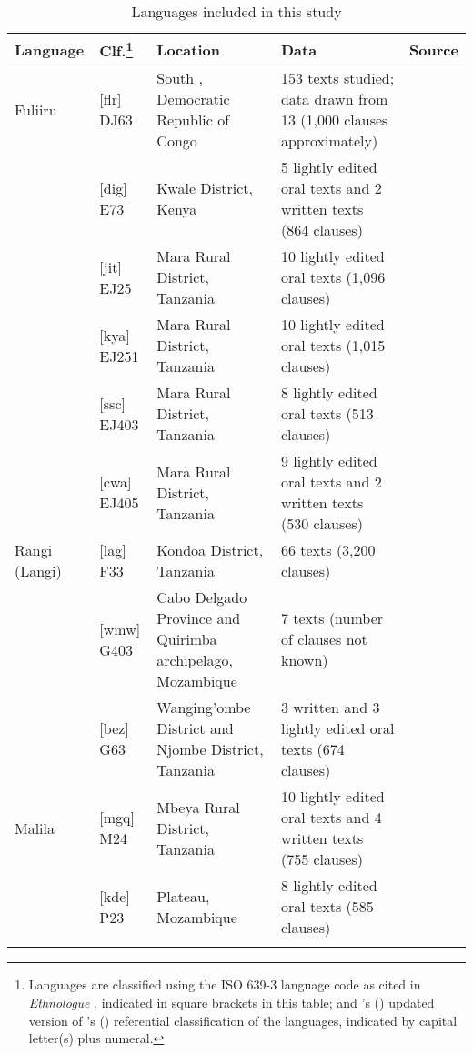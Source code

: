 \documentclass[output=paper]{langsci/langscibook}
\begin{document}
\begin{table}
 
\begin{tabularx}{\textwidth}{p{1.5cm}p{1cm}QQp{2cm}}
\lsptoprule
Language & Clf.\footnote{Languages are classified using the ISO 639-3 language code as cited in \textit{Ethnologue} \citep{lewisetal2015}, indicated in square brackets in this table; and \citeauthor{maho2003}’s (\citeyear{maho2003}) updated version of \citeauthor{guthrie1967}’s (\citeyear{guthrie1967}) referential classification of the  languages, indicated by capital letter(s) plus numeral.}
			    & Location & Data & Source\\
\midrule
Fuliiru & [flr] DJ63 & South , Democratic Republic of Congo & 153 texts studied; data drawn from 13 (1,000 clauses approximately) & \citet{vanotterloo2011,vanotterloo2015}\\
  & [dig] E73 & Kwale District, Kenya & 5 lightly edited oral texts and 2 written texts (864 clauses) & \citet{nicolle2015a}\\
  & [jit] EJ25 & Mara Rural District, Tanzania & 10 lightly edited oral texts (1,096 clauses) & \citet{pylerobinson2015}\\
  & [kya] EJ251 & Mara Rural District, Tanzania & 10 lightly edited oral texts (1,015 clauses) & \citet{odom2015}\\
  & [ssc] EJ403 & Mara Rural District, Tanzania & 8 lightly edited oral texts (513 clauses) & \citet{masatu2015}\\
  & [cwa] EJ405 & Mara Rural District, Tanzania & 9 lightly edited oral texts and 2 written texts (530 clauses) & \citet{walker2011}\\
 Rangi (Langi) & [lag] F33 & Kondoa District, Tanzania & 66 texts (3,200 clauses) & \citet{Stegen2011}\\
  & [wmw] G403 & Cabo Delgado Province and Quirimba archipelago, Mozambique & 7 texts (number of clauses not known) & \citet{floor2005}\\
  & [bez] G63 & Wanging’ombe District and Njombe District, Tanzania & 3 written and 3 lightly edited oral texts (674 clauses) & \citet{broomhall2011,eaton2015a}\\
 Malila & [mgq] M24 & Mbeya Rural District, Tanzania & 10 lightly edited oral texts and 4 written texts (755 clauses) & \citet{eaton2015b}\\
  & [kde] P23 &  Plateau, Mozambique & 8 lightly edited oral texts (585 clauses) & \citet{leach2015}\\

\lspbottomrule
\end{tabularx}

\caption{Languages included in this study}	
\label{tab:1.nicolle}
\end{table}
\end{document}
